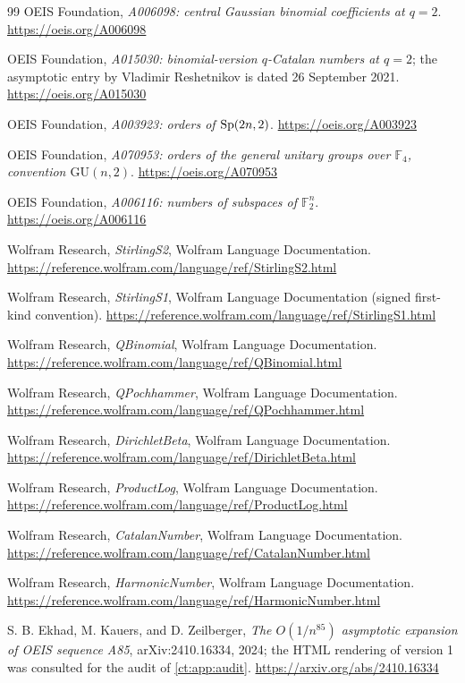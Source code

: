 \documentclass[11pt,openany]{book}
\numberwithin{equation}{chapter}
\theoremstyle{plain}
\theoremstyle{definition}
\theoremstyle{remark}
\newcommand{\F}{\mathbb F}
\begin{document}
\begin{thebibliography}{99}
OEIS Foundation, \emph{A006098: central Gaussian binomial coefficients at $q=2$}. \url{https://oeis.org/A006098}

OEIS Foundation, \emph{A015030: binomial-version $q$-Catalan numbers at $q=2$}; the asymptotic entry by Vladimir Reshetnikov is dated 26 September 2021. \url{https://oeis.org/A015030}

OEIS Foundation, \emph{A003923: orders of $\operatorname{Sp}(2n,2)$}. \url{https://oeis.org/A003923}

OEIS Foundation, \emph{A070953: orders of the general unitary groups over $\F_4$, convention $\mathrm{GU}(n,2)$}. \url{https://oeis.org/A070953}

OEIS Foundation, \emph{A006116: numbers of subspaces of $\F_2^n$}. \url{https://oeis.org/A006116}

Wolfram Research, \emph{StirlingS2}, Wolfram Language Documentation. \url{https://reference.wolfram.com/language/ref/StirlingS2.html}

Wolfram Research, \emph{StirlingS1}, Wolfram Language Documentation (signed first-kind convention). \url{https://reference.wolfram.com/language/ref/StirlingS1.html}

Wolfram Research, \emph{QBinomial}, Wolfram Language Documentation. \url{https://reference.wolfram.com/language/ref/QBinomial.html}

Wolfram Research, \emph{QPochhammer}, Wolfram Language Documentation. \url{https://reference.wolfram.com/language/ref/QPochhammer.html}

Wolfram Research, \emph{DirichletBeta}, Wolfram Language Documentation. \url{https://reference.wolfram.com/language/ref/DirichletBeta.html}

Wolfram Research, \emph{ProductLog}, Wolfram Language Documentation. \url{https://reference.wolfram.com/language/ref/ProductLog.html}

Wolfram Research, \emph{CatalanNumber}, Wolfram Language Documentation. \url{https://reference.wolfram.com/language/ref/CatalanNumber.html}

Wolfram Research, \emph{HarmonicNumber}, Wolfram Language Documentation. \url{https://reference.wolfram.com/language/ref/HarmonicNumber.html}

S. B. Ekhad, M. Kauers, and D. Zeilberger, \emph{The $O(1/n^{85})$ asymptotic expansion of OEIS sequence A85}, arXiv:2410.16334, 2024; the HTML rendering of version 1 was consulted for the audit of \cref{ct:app:audit}. \url{https://arxiv.org/abs/2410.16334}


\end{thebibliography}
\end{document}
